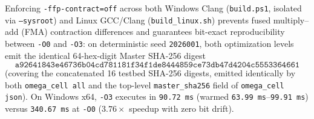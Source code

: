 \documentclass[11pt,reqno]{amsart}
\begin{document}
Enforcing \texttt{-ffp-contract=off} across both Windows Clang (\nolinkurl{build.ps1}, isolated via \texttt{--sysroot}) and Linux GCC/Clang (\nolinkurl{build_linux.sh}) prevents fused multiply--add (FMA) contraction differences and guarantees bit-exact reproducibility between \texttt{-O0} and \texttt{-O3}: on deterministic seed \texttt{2026001}, both optimization levels emit the identical 64-hex-digit Master SHA-256 digest
\[
  \texttt{a92641843e46736b04cd781181f34f1de8444859ce73db47d4204c5553364661}
\]
(covering the concatenated 16 testbed SHA-256 digests, emitted identically by both \nolinkurl{omega_cell all} and the top-level \texttt{master\_sha256} field of \nolinkurl{omega_cell json}). On Windows x64, \texttt{-O3} executes in \texttt{90.72 ms} (warmed \texttt{63.99 ms}--\texttt{99.91 ms}) versus \texttt{340.67 ms} at \texttt{-O0} ($3.76\times$ speedup with zero bit drift).
\end{document}
